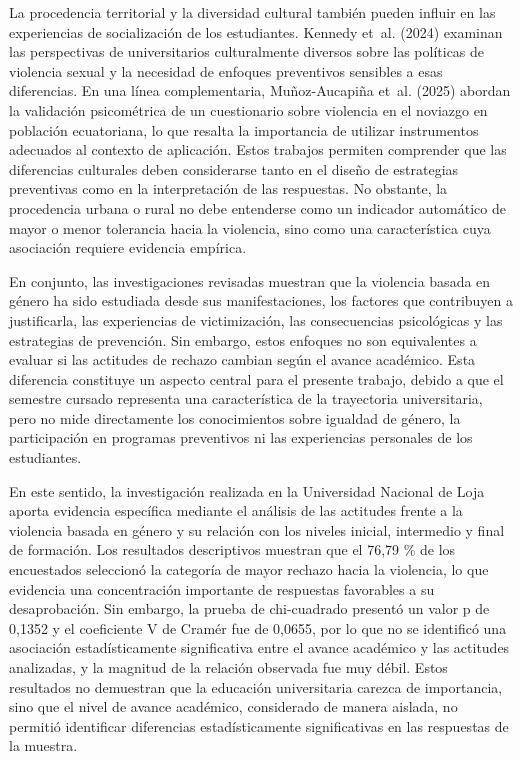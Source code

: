 \documentclass[
  spanish,
  11pt,
  letterpaper,
  DIV=11,
  numbers=noendperiod]{scrreprt}
\begin{document}
La procedencia territorial y la diversidad cultural también pueden
influir en las experiencias de socialización de los estudiantes. Kennedy
et~al. (2024) examinan las perspectivas de universitarios culturalmente
diversos sobre las políticas de violencia sexual y la necesidad de
enfoques preventivos sensibles a esas diferencias. En una línea
complementaria, Muñoz-Aucapiña et~al. (2025) abordan la validación
psicométrica de un cuestionario sobre violencia en el noviazgo en
población ecuatoriana, lo que resalta la importancia de utilizar
instrumentos adecuados al contexto de aplicación. Estos trabajos
permiten comprender que las diferencias culturales deben considerarse
tanto en el diseño de estrategias preventivas como en la interpretación
de las respuestas. No obstante, la procedencia urbana o rural no debe
entenderse como un indicador automático de mayor o menor tolerancia
hacia la violencia, sino como una característica cuya asociación
requiere evidencia empírica.

En conjunto, las investigaciones revisadas muestran que la violencia
basada en género ha sido estudiada desde sus manifestaciones, los
factores que contribuyen a justificarla, las experiencias de
victimización, las consecuencias psicológicas y las estrategias de
prevención. Sin embargo, estos enfoques no son equivalentes a evaluar si
las actitudes de rechazo cambian según el avance académico. Esta
diferencia constituye un aspecto central para el presente trabajo,
debido a que el semestre cursado representa una característica de la
trayectoria universitaria, pero no mide directamente los conocimientos
sobre igualdad de género, la participación en programas preventivos ni
las experiencias personales de los estudiantes.

En este sentido, la investigación realizada en la Universidad Nacional
de Loja aporta evidencia específica mediante el análisis de las
actitudes frente a la violencia basada en género y su relación con los
niveles inicial, intermedio y final de formación. Los resultados
descriptivos muestran que el 76,79 \% de los encuestados seleccionó la
categoría de mayor rechazo hacia la violencia, lo que evidencia una
concentración importante de respuestas favorables a su desaprobación.
Sin embargo, la prueba de chi-cuadrado presentó un valor p de 0,1352 y
el coeficiente V de Cramér fue de 0,0655, por lo que no se identificó
una asociación estadísticamente significativa entre el avance académico
y las actitudes analizadas, y la magnitud de la relación observada fue
muy débil. Estos resultados no demuestran que la educación universitaria
carezca de importancia, sino que el nivel de avance académico,
considerado de manera aislada, no permitió identificar diferencias
estadísticamente significativas en las respuestas de la muestra.
\end{document}
